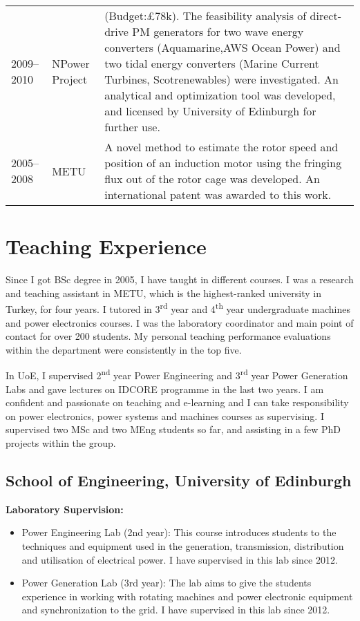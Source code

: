 \documentclass[a4paper,12pt]{article}
\begin{document}
\begin{longtable}{lp{3cm}p{12cm}}
2009--2010 & NPower Project & (Budget:£78k). The feasibility analysis of direct-drive PM generators for two wave energy converters (Aquamarine,AWS Ocean Power) and two tidal energy converters (Marine Current Turbines, Scotrenewables) were investigated. An analytical and optimization tool was developed, and licensed by University of Edinburgh for further use.\\
2005--2008 & METU & A novel method to estimate the rotor speed and position of an induction motor using the fringing flux out of the rotor cage was developed. An international patent was awarded to this work.\\
\end{longtable}

\clearpage

\section{Teaching Experience}

Since I got BSc degree in 2005, I have taught in different courses. I was a research and teaching assistant in METU, which is the highest-ranked university in Turkey, for four years. I tutored in 3\textsuperscript{rd} year and 4\textsuperscript{th} year undergraduate machines and power electronics courses. I was the laboratory coordinator and main point of contact for over 200 students. My personal teaching performance evaluations within the department were consistently in the top five.

In UoE, I supervised 2\textsuperscript{nd} year Power Engineering and 3\textsuperscript{rd} year Power Generation Labs and gave lectures on IDCORE programme in the last two years. I am confident and passionate on teaching and e-learning and I can take responsibility on power electronics, power systems and machines courses as supervising. I supervised two MSc and two MEng students so far, and assisting in a few PhD projects within the group.

\subsection{School of Engineering, University of Edinburgh}

\textbf{Laboratory Supervision:}
\begin{itemize}
\item Power Engineering Lab (2nd year): This course introduces students to the techniques and equipment used in the generation, transmission, distribution and utilisation of electrical power. I have supervised in this lab since 2012.
\item Power Generation Lab (3rd year): The lab aims to give the students experience in working with rotating machines and power electronic equipment and synchronization to the grid. I have supervised in this lab since 2012.

\end{itemize}
\end{document}
